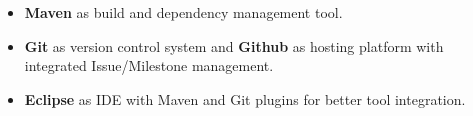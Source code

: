 \begin{itemize}
      \item \textbf{Maven} as build and dependency management tool.
      \item \textbf{Git} as version control system and \textbf{Github} as hosting platform with integrated Issue/Milestone management.
      \item \textbf{Eclipse} as IDE with Maven and Git plugins for better tool integration.
\end{itemize}